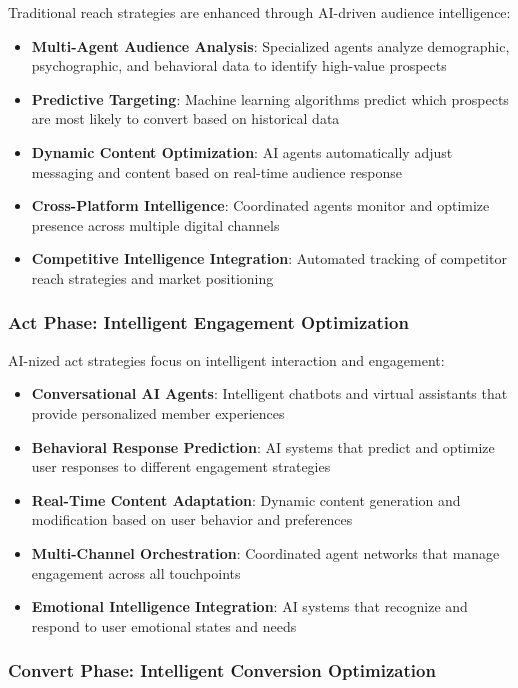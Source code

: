 Traditional reach strategies are enhanced through AI-driven audience intelligence:

\begin{itemize}
    \item \textbf{Multi-Agent Audience Analysis}: Specialized agents analyze demographic, psychographic, and behavioral data to identify high-value prospects
    \item \textbf{Predictive Targeting}: Machine learning algorithms predict which prospects are most likely to convert based on historical data
    \item \textbf{Dynamic Content Optimization}: AI agents automatically adjust messaging and content based on real-time audience response
    \item \textbf{Cross-Platform Intelligence}: Coordinated agents monitor and optimize presence across multiple digital channels
    \item \textbf{Competitive Intelligence Integration}: Automated tracking of competitor reach strategies and market positioning
\end{itemize}

\subsubsection{Act Phase: Intelligent Engagement Optimization}

AI-nized act strategies focus on intelligent interaction and engagement:

\begin{itemize}
    \item \textbf{Conversational AI Agents}: Intelligent chatbots and virtual assistants that provide personalized member experiences
    \item \textbf{Behavioral Response Prediction}: AI systems that predict and optimize user responses to different engagement strategies
    \item \textbf{Real-Time Content Adaptation}: Dynamic content generation and modification based on user behavior and preferences
    \item \textbf{Multi-Channel Orchestration}: Coordinated agent networks that manage engagement across all touchpoints
    \item \textbf{Emotional Intelligence Integration}: AI systems that recognize and respond to user emotional states and needs
\end{itemize}

\subsubsection{Convert Phase: Intelligent Conversion Optimization}

